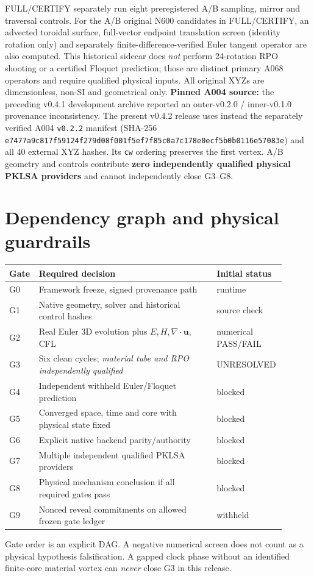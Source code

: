 \documentclass[11pt,a4paper]{article}
\begin{document}
FULL/CERTIFY separately run eight preregistered A/B sampling,
mirror and traversal controls. For the A/B original N600 candidates
in FULL/CERTIFY, an advected toroidal surface, full-vector endpoint
translation screen (identity rotation only) and separately
finite-difference-verified Euler tangent operator are also computed.
This historical sidecar does \emph{not} perform 24-rotation RPO
shooting or a certified Floquet prediction; those are distinct
primary A068 operators and require qualified physical inputs.
All original XYZs are dimensionless, non-SI and geometrical only.
\textbf{Pinned A004 source:} the preceding v0.4.1 development archive
reported an outer-v0.2.0 / inner-v0.1.0 provenance inconsistency.
The present v0.4.2 release uses instead the separately verified A004
\texttt{v0.2.2} manifest (SHA-256
\texttt{e7477a9c817f59124f279d08f001f5ef7f85c0a7c178e0ecf5b0b0116e57083e})
and all 40 external XYZ hashes. Its \texttt{cw} ordering preserves the
first vertex. A/B geometry and controls contribute \textbf{zero independently
qualified physical PKLSA providers} and cannot independently close G3--G8.

\section{Dependency graph and physical guardrails}
\begin{longtable}{p{0.07\linewidth}p{0.63\linewidth}p{0.20\linewidth}}
\toprule Gate & Required decision & Initial status\\\midrule
G0 & Framework freeze, signed provenance path & runtime\\
G1 & Native geometry, solver and historical control hashes & source check\\
G2 & Real Euler 3D evolution plus $E,H,\nabla\cdot\mathbf u$, CFL & numerical PASS/FAIL\\
G3 & Six clean cycles; \emph{material tube and RPO independently qualified} & UNRESOLVED\\
G4 & Independent withheld Euler/Floquet prediction & blocked\\
G5 & Converged space, time and core with physical state fixed & blocked\\
G6 & Explicit native backend parity/authority & blocked\\
G7 & Multiple independent qualified PKLSA providers & blocked\\
G8 & Physical mechanism conclusion if all required gates pass & blocked\\
G9 & Nonced reveal commitments on allowed frozen gate ledger & withheld\\\bottomrule\end{longtable}
Gate order is an explicit DAG. A negative numerical screen does not count as a physical hypothesis falsification. A gapped clock phase without an identified finite-core material vortex can \emph{never} close G3 in this release.
\end{document}
